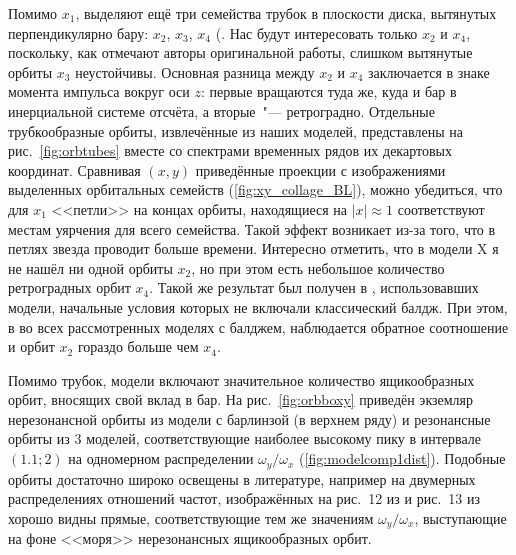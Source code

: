 \documentclass[tikz]{trlnotes}
\begin{document}
Помимо $x_1$, \citet{contopoulos1980a} выделяют ещё три семейства трубок в плоскости диска, вытянутых
перпендикулярно бару: $x_2$, $x_3$, $x_4$ (\cite[стр.~185]{2008gady.book.....B}. Нас будут интересовать
только $x_2$ и $x_4$, поскольку, как отмечают авторы оригинальной работы, слишком вытянутые орбиты $x_3$
неустойчивы. Основная разница между $x_2$ и $x_4$ заключается в знаке момента импульса вокруг оси $z$: первые
вращаются туда же, куда и бар в инерциальной системе отсчёта, а вторые~"--- ретроградно. Отдельные трубкообразные орбиты,
извлечённые из наших моделей, представлены на рис.~\ref{fig:orbtubes} вместе со спектрами временных рядов их декартовых координат. 
Сравнивая $(x,y)$ приведённые проекции с изображениями выделенных орбитальных семейств (\ref{fig:xy_collage_BL}),
можно убедиться, что для $x_1$ <<петли>> на концах орбиты, находящиеся на $|x|\approx 1$ соответствуют местам
уярчения для всего семейства. Такой эффект возникает из-за того, что в петлях звезда проводит больше времени.
Интересно отметить, что в модели X я не нашёл ни одной орбиты $x_2$, но при этом есть небольшое количество 
ретроградных орбит $x_4$. Такой же результат был получен в \citet{valluri2016,voglis2007}, использовавших
модели, начальные условия которых не включали классический балдж. При этом, в во всех
рассмотренных моделях с балджем, наблюдается обратное соотношение и орбит $x_2$ гораздо больше чем $x_4$.

Помимо трубок, модели включают значительное количество ящикообразных орбит, вносящих свой вклад
в бар. На рис.~\ref{fig:orbboxy} приведён экземляр нерезонансной орбиты из модели с барлинзой (в верхнем ряду)
и резонансные орбиты из 3 моделей, соответствующие наиболее высокому пику в интервале $(1.1;2)$ на одномерном 
распределении $ω_y/ω_x$ (\ref{fig:modelcomp1dist}).
Подобные орбиты достаточно широко освещены в литературе, например на двумерных распределениях отношений частот, изображённых
на рис.~12 из \cite{gajda2016} и рис.~13 из \cite{valluri2016} хорошо видны прямые, соответствующие тем же
значениям $ω_y/ω_x$, выступающие на фоне <<моря>> нерезонансных ящикообразных орбит.
\end{document}
